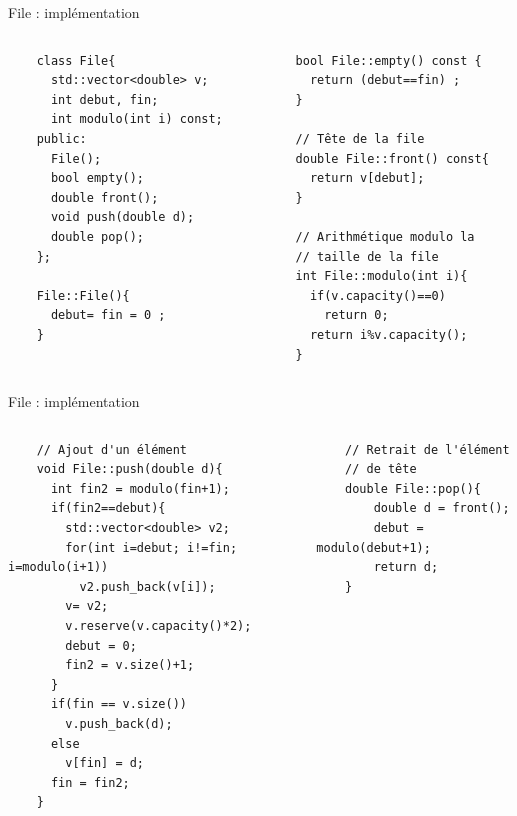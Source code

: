 \begin{frame}[fragile]{File : implémentation}
\begin{columns}
\begin{column}{0.40\linewidth}
    \begin{verbatim}
    class File{
      std::vector<double> v;
      int debut, fin;
      int modulo(int i) const;
    public:
      File();
      bool empty();
      double front();
      void push(double d);
      double pop();
    };
    
    File::File(){
      debut= fin = 0 ;
    }
    \end{verbatim}
\end{column}
\begin{column}{0.60\linewidth}   
    \begin{verbatim}
    bool File::empty() const {
      return (debut==fin) ;
    }
    
    // Tête de la file
    double File::front() const{
      return v[debut];
    }
    
    // Arithmétique modulo la
    // taille de la file
    int File::modulo(int i){
      if(v.capacity()==0)
        return 0;
      return i%v.capacity();
    }
  \end{verbatim}
\end{column}
\end{columns}
\end{frame}

\begin{frame}[fragile]{File : implémentation}
\vspace{1em}
\begin{columns}
\begin{column}{0.7\textwidth}
    \begin{verbatim}
    // Ajout d'un élément
    void File::push(double d){
      int fin2 = modulo(fin+1);
      if(fin2==debut){
        std::vector<double> v2;
        for(int i=debut; i!=fin; i=modulo(i+1))
          v2.push_back(v[i]);
        v= v2;
        v.reserve(v.capacity()*2);
        debut = 0;
        fin2 = v.size()+1;
      }
      if(fin == v.size())
        v.push_back(d);
      else
        v[fin] = d;
      fin = fin2;
    }
    \end{verbatim}
\end{column}
\begin{column}{0.4\textwidth}
    \begin{verbatim}
    // Retrait de l'élément
    // de tête
    double File::pop(){
        double d = front();
        debut = modulo(debut+1);
        return d;
    }
    \end{verbatim}
\end{column}
\end{columns}
\end{frame}

